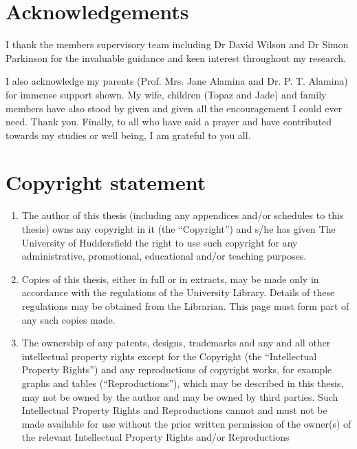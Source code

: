 \documentclass[12pt,twoside]{report}
\begin{document}
\chapter*{Acknowledgements}
I thank the members supervisory team including Dr David Wilson and Dr Simon Parkinson for the invaluable guidance and keen interest throughout my research.  

I also acknowledge my parents (Prof. Mrs. Jane Alamina and Dr. P. T. Alamina) for immense support shown.  My wife, children (Topaz and Jade) and family members have also stood by given and given all the encouragement I could ever need.  Thank you.  Finally, to all who have said a prayer and have contributed towards my studies or well being, I am grateful to you all.

\chapter*{Copyright statement}
\renewcommand{\theenumi}{\roman{enumi}}%
\begin{enumerate}
    \item The author of this thesis (including any appendices and/or schedules to this thesis) owns any copyright in it (the “Copyright”) and s/he has given The University of Huddersfield the right to use such copyright for any administrative, promotional, educational and/or teaching purposes.
    \item Copies of this thesis, either in full or in extracts, may be made only in accordance with the regulations of the University Library. Details of these regulations may be obtained from the Librarian. This page must form part of any such copies made.
    \item The ownership of any patents, designs, trademarks and any and all other intellectual property rights except for the Copyright (the “Intellectual Property Rights”) and any reproductions of copyright works, for example graphs and tables (“Reproductions”), which may be described in this thesis, may not be owned by the author and may be owned by third parties. Such Intellectual Property Rights and Reproductions cannot and must not be made available for use without the prior written permission of the owner(s) of the relevant Intellectual Property Rights and/or Reproductions
\end{enumerate}

\tableofcontents
\end{document}
